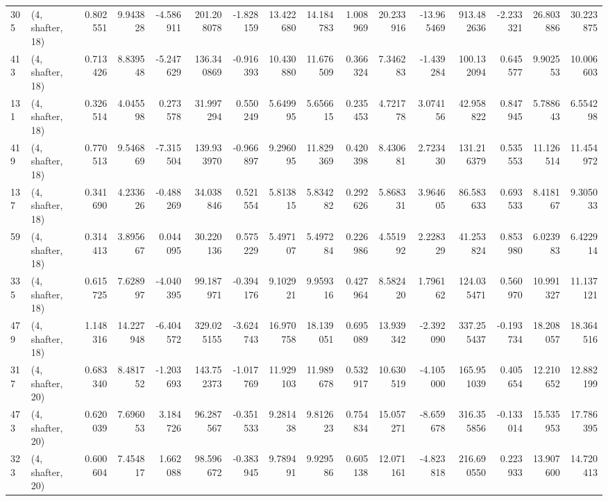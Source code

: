 \begin{tabular}{llrrrrrrrrrrrrrr}
305 &  (4, shafter, 18) &   0.802551 &   9.943828 &  -4.586911 &   201.208078 &  -1.828159 &  13.422680 &  14.184783 &  1.008969 &  20.233916 & -13.965469 &   913.482636 & -2.233321 &  26.803886 &  30.223875 \\
413 &  (4, shafter, 18) &   0.713426 &   8.839548 &  -5.247629 &   136.340869 &  -0.916393 &  10.430880 &  11.676509 &  0.366324 &   7.346283 &  -1.439284 &   100.132094 &  0.645577 &   9.902553 &  10.006603 \\
131 &  (4, shafter, 18) &   0.326514 &   4.045598 &   0.273578 &    31.997294 &   0.550249 &   5.649995 &   5.656615 &  0.235453 &   4.721778 &   3.074156 &    42.958822 &  0.847945 &   5.788643 &   6.554298 \\
419 &  (4, shafter, 18) &   0.770513 &   9.546869 &  -7.315504 &   139.933970 &  -0.966897 &   9.296095 &  11.829369 &  0.420398 &   8.430681 &   2.723430 &   131.216379 &  0.535553 &  11.126514 &  11.454972 \\
137 &  (4, shafter, 18) &   0.341690 &   4.233626 &  -0.488269 &    34.038846 &   0.521554 &   5.813815 &   5.834282 &  0.292626 &   5.868331 &   3.964605 &    86.583633 &  0.693533 &   8.418167 &   9.305033 \\
59  &  (4, shafter, 18) &   0.314413 &   3.895667 &   0.044095 &    30.220136 &   0.575229 &   5.497107 &   5.497284 &  0.226986 &   4.551992 &   2.228329 &    41.253824 &  0.853980 &   6.023983 &   6.422914 \\
335 &  (4, shafter, 18) &   0.615725 &   7.628997 &  -4.040395 &    99.187971 &  -0.394176 &   9.102921 &   9.959316 &  0.427964 &   8.582420 &   1.796162 &   124.035471 &  0.560970 &  10.991327 &  11.137121 \\
479 &  (4, shafter, 18) &   1.148316 &  14.227948 &  -6.404572 &   329.025155 &  -3.624743 &  16.970758 &  18.139051 &  0.695089 &  13.939342 &  -2.392090 &   337.255437 & -0.193734 &  18.208057 &  18.364516 \\
317 &  (4, shafter, 20) &   0.683340 &   8.481752 &  -1.203693 &   143.752373 &  -1.017769 &  11.929103 &  11.989678 &  0.532917 &  10.630519 &  -4.105000 &   165.951039 &  0.405654 &  12.210652 &  12.882199 \\
473 &  (4, shafter, 20) &   0.620039 &   7.696053 &   3.184726 &    96.287567 &  -0.351533 &   9.281438 &   9.812623 &  0.754834 &  15.057271 &  -8.659678 &   316.355856 & -0.133014 &  15.535953 &  17.786395 \\
323 &  (4, shafter, 20) &   0.600604 &   7.454817 &   1.662088 &    98.596672 &  -0.383945 &   9.789491 &   9.929586 &  0.605138 &  12.071161 &  -4.823818 &   216.690550 &  0.223933 &  13.907600 &  14.720413 \\

\end{tabular}
